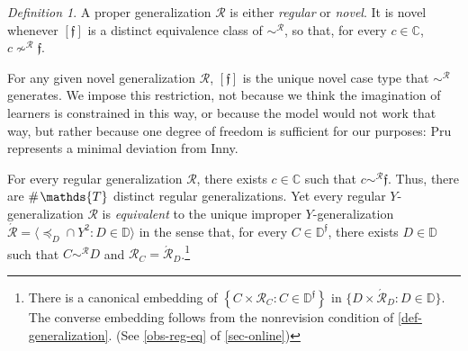 \documentclass[ecta,nameyear,draft]{econsocart}
\makeatletter
\newcommand{\Ext}{\operatorname{ext}}
\newcommand{\countof}{\mathbin{\#}\hskip1pt}
\newcommand{\mc}{\mathcal}
\newcommand{\novel}{\mathfrak f}
\newcommand{\preceqb}{\mathbin{\preceq}}
\newcommand{\ext}{\mathrel{\mc R}}
\newcommand{\supext}{{\ext}}
\newcommand{\extb}{\mathbin{\mc R}}
\newcommand{\aext}{\mathrel{\acute{\mathrel{\mathcal R}}}}
\newcommand{\aextb}{\mathbin{\acute{\mathbin{\mathcal R}}}}
\newcommand{\mbbd}{{\mathds D}}
\newcommand{\mbbdp}{{\mathds D^{\novel}}}
\newcommand{\mbbc}{{\mathds C}}
\newcommand{\mbbt}{{\mathds {T}}}
\newcommand\ie{i\@.e\@ifnextchar.{}{.\@}}
\theoremstyle{plain}
\theoremstyle{remark}
\newtheorem*{definition*}{Definition}
\makeatother
\begin{document}
\begin{definition*}\label{def-novel} A proper generalization $\ext$ is either
  \emph{regular} or \emph{novel}.  It is novel whenever $[\novel]$ is a
  distinct equivalence class of $\sim^{\supext}$, so that, for every $c \in
  \mbbc$, $c \nsim^\supext \novel$.
\end{definition*}

For any given novel generalization $\ext$, $[\novel]$ is the unique novel
case type that $\sim^{\extb}$ generates.  We impose this restriction, not
because we think the imagination of learners is constrained in this way, or
because the model would not work that way, but rather because one degree of
freedom is sufficient for our purposes: {Pru} represents a minimal deviation
from Inny.


For every regular generalization $\ext$, there exists $c \in \mbbc$ such that
$c \sim^{\extb} \novel$. Thus, there are $\countof{\mbbt}$ distinct regular
generalizations. Yet every regular $Y$-generalization $\ext$ is
\emph{equivalent} to the unique improper
$Y$-generalization $\aext = \langle \preceqb_{D} \cap Y^{2}: D \in
\mbbd\rangle$ in the sense that, for every $C \in \mbbdp$, there exists $D \in
\mbbd$ such that $C \sim^{\extb} D$ and $\extb_{C} =
\aextb_{D}$.\footnote{There is a canonical embedding of $\left\{C \times
  \extb_{C}: C \in \mbbdp\right\}$
  in $\{D \times \aextb_{D}: D \in \mbbd\}$. The converse embedding follows
  from the nonrevision condition of \cref{def-generalization}. (See
\cref{obs-reg-eq} of \cref{sec-online})}
\end{document}
